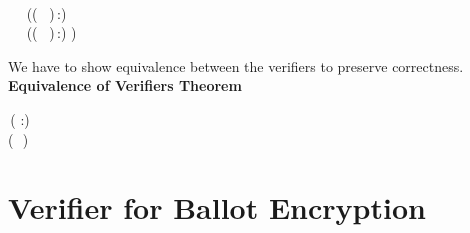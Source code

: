 \begin{holmath}
\,\\
\,\,\,\,\,\,\,\HOLSymConst{=}\,((\,\HOLSymConst{\HOLTokenProd{}}\,\,\,\,)\,:)\,\,\,\HOLSymConst{\HOLTokenConj{}}\\
\,\,\,\,\HOLBoundVar{\ensuremath{\alpha}}\,\,\,\HOLSymConst{=}\,((\,\HOLSymConst{\HOLTokenProd{}}\,\,\,\,)\,:)\,\,)
\end{holmath}  
We have to show equivalence between the verifiers to preserve correctness.
\textbf{Equivalence of Verifiers Theorem}
\begin{holmath}
    \,( :)\,\HOLSymConst{\HOLTokenImp{}}\\
(\,\,\HOLSymConst{\HOLTokenEquiv{}}\,\,)
\end{holmath}  
\newpage
\section{Verifier for Ballot Encryption}

